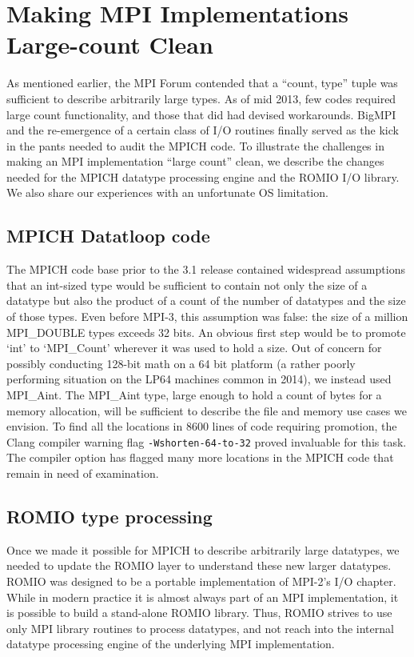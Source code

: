 
\section{Making MPI Implementations Large-count Clean}
As mentioned earlier, the MPI Forum contended that a ``count, type''
tuple was sufficient to describe arbitrarily large types.  As of mid 2013, few codes
required large count functionality, and those that did had devised workarounds.
BigMPI and the re-emergence of a certain class of I/O routines finally served
as the kick in
the pants needed to audit the MPICH code.  To illustrate the challenges in
making an MPI implementation ``large count'' clean, we describe the changes
needed for the MPICH datatype processing engine and the ROMIO I/O library. We
also share our experiences with an unfortunate OS limitation.


\subsection{MPICH Datatloop code}
The MPICH code base prior to the
3.1 release contained widespread assumptions that an int-sized type
would be sufficient to contain not only the size of a datatype but also the product
of a count of the number of datatypes and the size of those types.
Even before MPI-3, this assumption was false: the size of a million MPI\_DOUBLE
types exceeds 32 bits.
An obvious first step would be to promote `int' to `MPI\_Count' wherever it was
used to hold a size.
Out of concern for possibly conducting 128-bit math on a 64 bit platform (a
rather poorly performing situation on the LP64 machines common in 2014),
we instead used MPI\_Aint.  The MPI\_Aint type, large enough to hold a
count of bytes for a memory allocation, will be sufficient to describe the file
and memory use cases we envision.  To find all the locations in 8600 lines of
code requiring promotion, the Clang compiler warning flag
\texttt{-Wshorten-64-to-32} proved invaluable for this task.  The compiler option has
flagged many more
locations in the MPICH code that remain in need of examination.

\subsection{ROMIO type processing}
\label{sec:romio_typeproc}

Once we made it possible for MPICH to describe arbitrarily large datatypes, we
needed to update the ROMIO layer to understand these new larger datatypes.
ROMIO \cite{thakur:mpi-io-implement} was designed to be a portable
 implementation of MPI-2's I/O
chapter.  While in modern practice it is almost always part of an MPI
implementation, it is possible to build a stand-alone ROMIO library.  Thus,
ROMIO strives to use only MPI library routines to process datatypes, and not reach into the internal datatype processing engine of the underlying MPI implementation.

